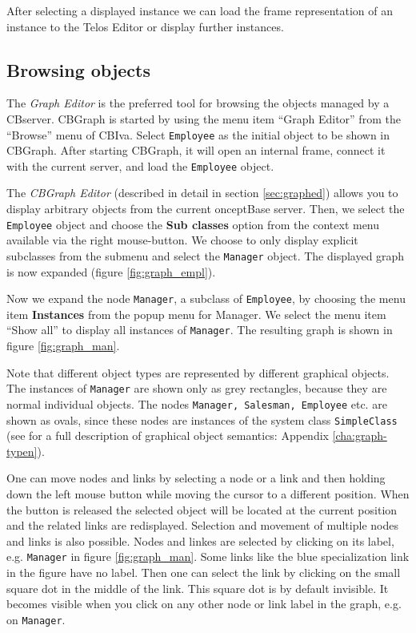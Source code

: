 
After selecting a displayed instance we can load the frame representation
of an instance to the Telos Editor or display further instances.

\subsection{Browsing objects}

The {\em Graph Editor\/} is the preferred tool for browsing the objects managed
by a CBserver.
CBGraph is started by using the menu item ``Graph Editor'' from the ``Browse''
menu of CBIva. Select {\tt Employee} as the initial object to be shown in CBGraph.
After starting CBGraph, it will open an internal frame, connect
it with the current server, and load the {\tt Employee} object.

The {\em CBGraph Editor} (described in detail in section \ref{sec:graphed}) allows you to
display arbitrary objects from the current onceptBase server.
Then, we select the {\tt Employee} object and choose the {\bf Sub classes} option from the context menu available via
the right mouse-button. We choose to only display explicit subclasses from the submenu and
select the {\tt Manager} object.
The displayed graph is now expanded (figure \ref{fig:graph_empl}).



Now we expand the node {\tt Manager}, a subclass of {\tt Employee}, by choosing the
menu item {\bf Instances} from the popup menu for Manager. We select the menu item
``Show all'' to display all instances of {\tt Manager}.
The resulting graph is shown in figure \ref{fig:graph_man}.


Note that different object types are represented by different graphical objects.
The instances of {\tt Manager} are
shown only as grey rectangles, because they are normal individual objects.
The nodes {\tt Manager, Salesman, Employee} etc. are shown as ovals,
since these nodes are instances of the system class {\tt SimpleClass} (see
 for a full description of  graphical
object semantics: Appendix \ref{cha:graph-typen}).


One can move nodes and links by selecting a node or a link and then holding
down the left mouse button while moving the cursor to a different
position. When the button is released the selected object will be located
at the current position and the related links are redisplayed.
Selection and movement of multiple nodes and links is also possible.
Nodes and linkes are selected by clicking on its label, e.g. {\tt Manager}
in figure \ref{fig:graph_man}. Some links like the blue specialization
link in the figure have no label. Then one can select the link by clicking on the
small square dot in the middle of the link. This square dot is by default invisible.
It becomes visible when you click on any other node or link label in the graph,
e.g. on {\tt Manager}. 

